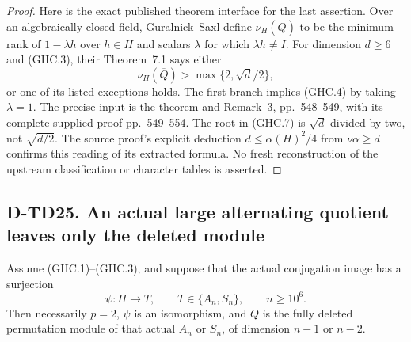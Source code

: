 \begin{proof}
Here is the exact published theorem interface for the last assertion.
Over an algebraically closed field, Guralnick--Saxl define
$\nu_H(\overline Q)$ to be the minimum rank of $1-\lambda h$
over $h\in H$ and scalars $\lambda$ for which $\lambda h\ne I$.
For dimension $d\ge6$ and (GHC.3), their Theorem~7.1 says either
\[
             \nu_H(\overline Q)>\max\{2,\sqrt d/2\},
 \tag{GHC.7}
\]
or one of its listed exceptions holds.  The first branch implies
(GHC.4) by taking $\lambda=1$.  The precise input is the theorem
and Remark~3, pp.~548--549, with its complete supplied proof
pp.~549--554.\cite{BI:GS}
The root in (GHC.7) is $\sqrt d$ divided by two, not
$\sqrt{d/2}$.  The source proof's explicit deduction
$d\le\alpha(H)^2/4$ from $\nu\alpha\ge d$ confirms this
reading of its extracted formula.  No fresh reconstruction of
the upstream classification or character tables is asserted.
\end{proof}

\subsection*{D-TD25. An actual large alternating quotient leaves only the deleted module}

\begin{theorem}[D-TD25]
Assume (GHC.1)--(GHC.3), and suppose that the actual conjugation
image has a surjection
\[
             \psi:H\longrightarrow T,\qquad
             T\in\{A_n,S_n\},\qquad n\ge10^6.
 \tag{GHC.8}
\]
Then necessarily $p=2$, $\psi$ is an isomorphism, and $Q$ is
the fully deleted permutation module of that actual $A_n$ or
$S_n$, of dimension $n-1$ or $n-2$.
\end{theorem}

